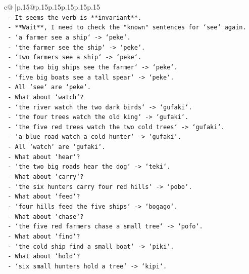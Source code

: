 \documentclass{article}
\begin{document}
{\begin{supertabular}{c@{$\;$}|p{.15\linewidth}@{}p{.15\linewidth}p{.15\linewidth}p{.15\linewidth}p{.15\linewidth}p{.15\linewidth}}
{{{\\ 
\texttt{   {-} It seems the verb is **invariant**.} \\
\texttt{   {-} **Wait**, I need to check the "known" sentences for `see` again.} \\
\texttt{   {-} `a farmer see a ship` {-}> `peke`.} \\
\texttt{   {-} `the farmer see the ship` {-}> `peke`.} \\
\texttt{   {-} `two farmers see a ship` {-}> `peke`.} \\
\texttt{   {-} `the two big ships see the farmer` {-}> `peke`.} \\
\texttt{   {-} `five big boats see a tall spear` {-}> `peke`.} \\
\texttt{   {-} All `see` are `peke`.} \\
\texttt{   {-} What about `watch`?} \\
\texttt{   {-} `the river watch the two dark birds` {-}> `gufaki`.} \\
\texttt{   {-} `the four trees watch the old king` {-}> `gufaki`.} \\
\texttt{   {-} `the five red trees watch the two cold trees` {-}> `gufaki`.} \\
\texttt{   {-} `a blue road watch a cold hunter` {-}> `gufaki`.} \\
\texttt{   {-} All `watch` are `gufaki`.} \\
\texttt{   {-} What about `hear`?} \\
\texttt{   {-} `the two big roads hear the dog` {-}> `teki`.} \\
\texttt{   {-} What about `carry`?} \\
\texttt{   {-} `the six hunters carry four red hills` {-}> `pobo`.} \\
\texttt{   {-} What about `feed`?} \\
\texttt{   {-} `four hills feed the five ships` {-}> `bogago`.} \\
\texttt{   {-} What about `chase`?} \\
\texttt{   {-} `the five red farmers chase a small tree` {-}> `pofo`.} \\
\texttt{   {-} What about `find`?} \\
\texttt{   {-} `the cold ship find a small boat` {-}> `piki`.} \\
\texttt{   {-} What about `hold`?} \\
\texttt{   {-} `six small hunters hold a tree` {-}> `kipi`.} \\
\\ 
}}}
\end{supertabular}}
\end{document}

